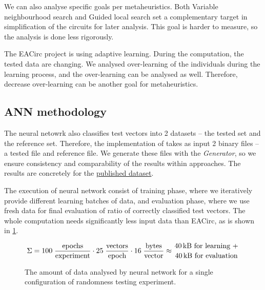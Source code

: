 \documentclass[
  print, %
  Table,   %
  nolof,     %
  nolot,     %
  11pt, %
  oneside  %
]{fithesis3}
\begin{document}
We can also analyse specific goals per metaheuristics. Both Variable neighbourhood search and Guided local search set a complementary target in simplification of the circuits for later analysis. This goal is harder to measure, so the analysis is done less rigorously.

The EACirc project is using adaptive learning. During the computation, the tested data are changing. We analysed over-learning of the individuals during the learning process, and the over-learning can be analysed as well. Therefore, decrease over-learning can be another goal for metaheuristics.


\subsection{ANN methodology}
\label{subsubsec:method-spec-ms-aco}


The neural netowrk also classifies test vectors into 2 datasets -- the tested set and the reference set. Therefore, the implementation of takes as input 2 binary files -- a tested file and reference file. We generate these files with the \textit{Generator}, so we ensure consistency and comparability of the results within approaches. The results are concretely for the \href{https://drive.google.com/drive/folders/0B5Z1zst5NzwXQmFKaXgxREJWNk0?usp=sharing}{published dataset}.

The execution of neural network consist of training phase, where we iteratively provide different learning batches of data, and evaluation phase, where we use fresh data for final evaluation of ratio of correctly classified test vectors. The whole computation needs significantly less input data than EACirc, as is shown in \cref{fig:ann-dataUsage}.

\begin{figure}[t]
    \begin{equation*}
        \begin{aligned}
    \Sigma = 
             100 \;
             \frac{\textnormal{epochs}}
                  {\textnormal{experiment}}
             \cdot
             25 \;
             \frac{\textnormal{vectors}}
                  {\textnormal{epoch}}
             \cdot
             16 \;
             \frac{\textnormal{bytes}}
                  {\textnormal{vector}}
             \approx {40 \textnormal{\,kB for learning +} \atop {40 \textnormal{\,kB for evaluation}}}
        \end{aligned}
    \end{equation*}
    \caption{The amount of data analysed by neural network for a single configuration of randomness testing experiment.}
    \label{fig:ann-dataUsage}
\end{figure}
\end{document}
